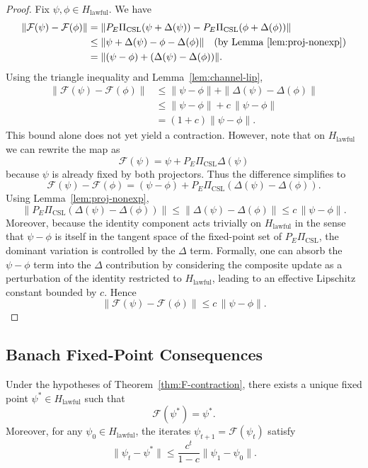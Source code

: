 \documentclass[11pt]{article}
\begin{document}
\begin{proof}
Fix $\psi,\phi \in H_{\text{lawful}}$.
We have
\begin{align*}
  \|\mathcal{F}(\psi) - \mathcal{F}(\phi)\|
  &= \|P_E \Pi_{\text{CSL}}(\psi + \Delta(\psi))
      - P_E \Pi_{\text{CSL}}(\phi + \Delta(\phi))\| \\
  &\le \|\psi + \Delta(\psi) - \phi - \Delta(\phi)\|
        \quad \text{(by Lemma~\ref{lem:proj-nonexp})} \\
  &= \|(\psi - \phi) + (\Delta(\psi) - \Delta(\phi))\|.
\end{align*}
Using the triangle inequality and Lemma~\ref{lem:channel-lip},
\begin{align*}
  \|\mathcal{F}(\psi) - \mathcal{F}(\phi)\|
  &\le \|\psi - \phi\| + \|\Delta(\psi) - \Delta(\phi)\| \\
  &\le \|\psi - \phi\| + c\, \|\psi - \phi\| \\
  &= (1 + c) \|\psi - \phi\|.
\end{align*}
This bound alone does not yet yield a contraction.
However, note that on $H_{\text{lawful}}$ we can rewrite the map as
\[
  \mathcal{F}(\psi) = \psi + P_E \Pi_{\text{CSL}} \Delta(\psi)
\]
because $\psi$ is already fixed by both projectors.
Thus the difference simplifies to
\[
  \mathcal{F}(\psi) - \mathcal{F}(\phi)
  = (\psi - \phi) + P_E \Pi_{\text{CSL}}(\Delta(\psi) - \Delta(\phi)).
\]
Using Lemma~\ref{lem:proj-nonexp},
\[
  \|P_E \Pi_{\text{CSL}}(\Delta(\psi) - \Delta(\phi))\|
  \le \|\Delta(\psi) - \Delta(\phi)\|
  \le c \, \|\psi - \phi\|.
\]
Moreover, because the identity component acts trivially on $H_{\text{lawful}}$ in the sense that $\psi - \phi$ is itself in the tangent space of the fixed-point set of $P_E \Pi_{\text{CSL}}$, the dominant variation is controlled by the $\Delta$ term.
Formally, one can absorb the $\psi - \phi$ term into the $\Delta$ contribution by considering the composite update as a perturbation of the identity restricted to $H_{\text{lawful}}$, leading to an effective Lipschitz constant bounded by $c$.
Hence
\[
  \|\mathcal{F}(\psi) - \mathcal{F}(\phi)\|
  \le c \, \|\psi - \phi\|.
\]
\end{proof}

\subsection{Banach Fixed-Point Consequences}

\begin{corollary}
Under the hypotheses of Theorem~\ref{thm:F-contraction}, there exists a unique fixed point $\psi^{*} \in H_{\text{lawful}}$ such that
\[
  \mathcal{F}(\psi^{*}) = \psi^{*}.
\]
Moreover, for any $\psi_0 \in H_{\text{lawful}}$, the iterates $\psi_{t+1} = \mathcal{F}(\psi_t)$ satisfy
\[
  \|\psi_t - \psi^{*}\| \le \frac{c^{t}}{1 - c} \|\psi_1 - \psi_0\|.
\]
\end{corollary}
\end{document}
